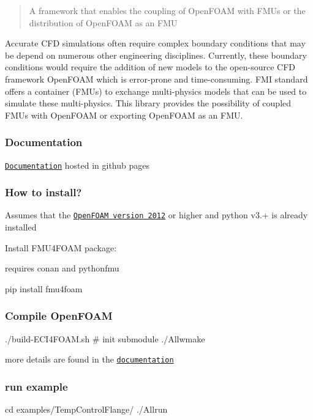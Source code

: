 \begin{quote}
A framework that enables the coupling of Open\+F\+O\+AM with F\+M\+Us or the distribution of Open\+F\+O\+AM as an F\+MU \end{quote}


Accurate C\+FD simulations often require complex boundary conditions that may be depend on numerous other engineering disciplines. Currently, these boundary conditions would require the addition of new models to the open-\/source C\+FD framework Open\+F\+O\+AM which is error-\/prone and time-\/consuming. F\+MI standard offers a container (F\+M\+Us) to exchange multi-\/physics models that can be used to simulate these multi-\/physics. This library provides the possibility of coupled F\+M\+Us with Open\+F\+O\+AM or exporting Open\+F\+O\+AM as an F\+MU.

\subsubsection*{Documentation}

\href{https://DLR-RY.github.io/FMU4FOAM/}{\tt Documentation} hosted in github pages

\subsubsection*{How to install?}

Assumes that the \href{https://www.openfoam.com/download/release-history}{\tt Open\+F\+O\+AM version 2012} or higher and python v3.+ is already installed


\begin{DoxyEnumerate}
\item Install {\ttfamily F\+M\+U4\+F\+O\+AM} package\+:
\end{DoxyEnumerate}

requires conan and pythonfmu 
\begin{DoxyCode}
pip install fmu4foam
\end{DoxyCode}
 \subsubsection*{Compile Open\+F\+O\+AM}


\begin{DoxyCode}
./build-ECI4FOAM.sh # init submodule
./Allwmake
\end{DoxyCode}


more details are found in the \href{https://DLR-RY.github.io/FMU4FOAM/}{\tt documentation}

\subsubsection*{run example}


\begin{DoxyCode}
cd examples/TempControlFlange/
./Allrun
\end{DoxyCode}
 